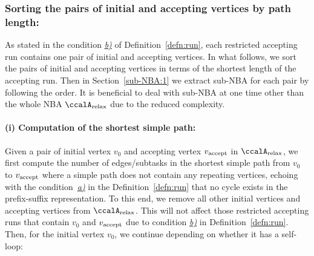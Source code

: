 \documentclass[Afour,sageh,times]{sagej}
\newcommand{\auto}[1]{\ccalA_{\textup{#1}}}
\newcommand{\vertex}[1]{v_{\textup{#1}}}
\begin{document}
{%

  \subsubsection{Sorting the pairs of initial and accepting vertices by path length:}\label{sec:sort}  As stated in the condition \hyperref[cond:b]{\it b)} of Definition~\ref{defn:run}, each restricted accepting run  contains  one pair of initial and accepting vertices. In what follows, we sort the pairs of initial and accepting vertices in terms of the shortest length of the accepting run.  Then in Section~\ref{sub-NBA:1} we extract sub-NBA for each pair by following the order. It is beneficial to deal with sub-NBA at one time other than the whole NBA $\auto{relax}$ due to the reduced complexity.
  \paragraph{(i) Computation of the shortest simple path:} Given a pair of initial vertex $v_0$ and accepting vertex $\vertex{accept}$ in $\auto{relax}$, we first compute the number of edges/subtasks in the shortest simple path from  $v_0$ to $\vertex{accept}$ where a simple path does not contain any  repeating vertices, echoing with the condition~\hyperref[cond:a]{\it a)} in the Definition~\ref{defn:run} that no cycle exists in the prefix-suffix representation.
  To this end, we remove all other initial vertices and accepting vertices from $\auto{relax}$. This will not affect those restricted  accepting runs that contain $v_0$ and $\vertex{accept}$ due to condition \hyperref[cond:b]{\it b)}  in Definition~\ref{defn:run}.  Then, for the initial vertex $v_0$, we continue depending on whether it has a self-loop:
}
\end{document}
